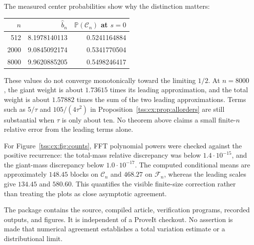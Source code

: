 \documentclass[11pt]{article}
\theoremstyle{remark}\newtheorem{remark}[theorem]{Remark}
\theoremstyle{definition}\newtheorem{definition}[theorem]{Definition}
\newcommand{\Prob}{\mathbb P}
\newcommand{\Cev}{\mathcal C_n}
\newcommand{\Fev}{\mathcal F_n}
\begin{document}
The measured center probabilities show why the distinction matters:
\begin{center}
\begin{tabular}{@{}rrr@{}}
\toprule
$n$ & $\widehat b_n$ & $\Prob(\Cev)$ at $s=0$\\
\midrule
512   & 8.1978140113 & 0.5241164884\\
2000  & 9.0845092174 & 0.5341770504\\
8000  & 9.9620885205 & 0.5498246417\\
\bottomrule
\end{tabular}
\end{center}
These values do not converge monotonically toward the limiting
$1/2$. At $n=8000$, the giant weight is about $1.73615$ times its
leading approximation, and the total weight is about $1.57882$
times the sum of the two leading approximations. Terms such as
$5/\tau$ and $105/(4\tau^2)$ in
Proposition~\ref{tss:cx:prop:allorders} are still substantial when
$\tau$ is only about ten. No theorem above claims a small
finite-$n$ relative error from the leading terms alone.

For Figure~\ref{tss:cx:fig:counts}, FFT polynomial powers were checked
against the positive recurrence: the total-mass relative discrepancy
was below $1.4\cdot10^{-15}$, and the giant-mass discrepancy below
$1.0\cdot10^{-17}$. The computed conditional means are approximately
$148.45$ blocks on $\Cev$ and $468.27$ on $\Fev$, whereas the
leading scales give $134.45$ and $580.60$. This quantifies the
visible finite-size correction rather than treating the plots as
close asymptotic agreement.

The package contains the source, compiled article, verification
programs, recorded outputs, and figures. It is independent of a
ProveIt checkout. No assertion is made that numerical agreement
establishes a total variation estimate or a distributional limit.
\end{document}
